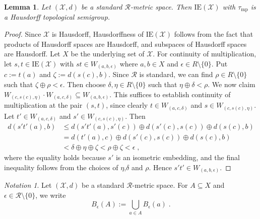 \documentclass{article}
\newtheorem{lemma}[theorem]{Lemma}
\theoremstyle{remark}
\newtheorem{notation}[theorem]{Notation}
\theoremstyle{definition}
\newcommand{\mpw}[0]{\tau_{\mathrm{mp}}}
\renewcommand\leq{\leqslant}
\newcommand{\rr}[0]{\mathcal{R}}
\newcommand{\ie}[0]{\mathrm{IE}}
\begin{document}
{{{{{\begin{lemma}\label{lem:hausdorff} Let $(\mathcal{X}, d)$ be a standard $\rr$-metric space. Then $\ie(\mathcal{X})$ with $\mpw$ is a Hausdorff topological semigroup. 
\end{lemma}
\begin{proof} Since $\mathcal{X}$ is Hausdorff, Hausdorffness of $\ie(\mathcal{X})$ follows from the fact that products of Hausdorff spaces are Hausdorff, and  subspaces of Hausdorff spaces are Hausdorff. Let $X$ be the underlying set of $\mathcal{X}$.
For continuity of multiplication, let $s,t\in \ie(\mathcal X)$ with $st\in W_{(a,b,\epsilon)}$ where $a,b\in X$ and $\epsilon\in R\setminus\{0\}$.
Put $c:=t(a)$ and $\zeta:=d(s(c),b)$. {Since $\rr$ is standard, we can find $\rho\in R\setminus\{0\}$ such that $\zeta\oplus\rho<\epsilon$. Then choose $\delta,\eta\in  R\setminus\{0\}$}
{such that $\eta\oplus\delta<\rho$. We now claim $W_{(c, s(c), \eta)}\cdot W_{(a, c, \delta)} \subseteq W_{(a,b,\epsilon)}$. {This suffices to establish continuity of multiplication at the pair $(s,t)$,}
since clearly $t\in W_{(a, c, \delta)}$ and $s\in W_{(c, s(c), \eta)}$. 
Let $t'\in W_{(a, c, \delta)}$ and $s'\in W_{(c, s(c), \eta)}$. Then
\begin{align*}
  d(s't'(a), b) &\leq d(s't'(a), s'(c))\oplus d(s'(c), s(c))\oplus d(s(c),b) \\
  &= d(t'(a), c)\oplus d(s'(c), s(c))\oplus d(s(c),b)\\
  &<\delta \oplus \eta\oplus \zeta<\rho\oplus\zeta<\epsilon\;,
\end{align*}
where the equality holds because $s'$ is an isometric embedding, and the final inequality follows from the choices of $\eta$,$\delta$ and $\rho$. Hence $s't'\in W_{(a,b,\epsilon)}$.}
\end{proof}


\begin{notation} {Let $(\mathcal{X}, d)$ be a standard $\rr$-metric space. For $A\subseteq X$ and $\epsilon\in\rr\setminus\{0\}$, we write}
\[B_\epsilon(A):=\bigcup_{a\in A}B_\epsilon(a)\;.\]   
\end{notation}

}}}}}
\end{document}
